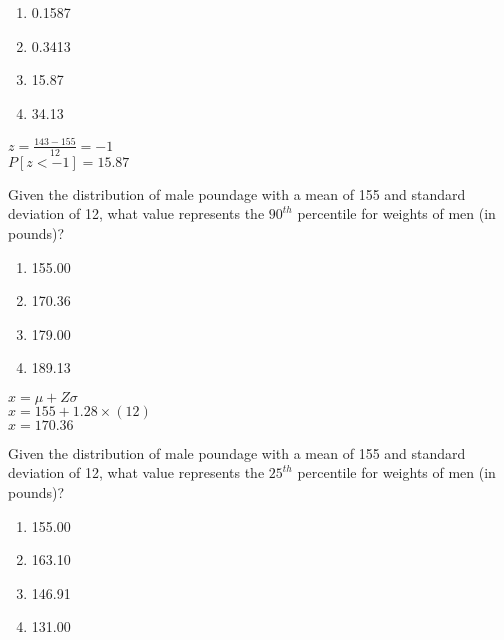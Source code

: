 \documentclass[11pt]{book}\usepackage[]{graphicx}\usepackage[]{color}
\begin{document}
\begin{exercises}
\begin{exercise}
	  \begin{enumerate}
	  \item 0.1587
	  \item 0.3413
	  \item 15.87
	  \item 34.13
	  \end{enumerate}
	  \vspace{2mm}
	\end{exercise}
	\begin{solution}   %

	    $z = \frac{143 - 155}{12} = -1$ \\
	    $P[z < -1] = 15.87$

	\end{solution}


  \begin{exercise} %

    Given the distribution of male poundage with a mean of 155 and standard deviation of 12, what value
represents the $90^{th}$ percentile for weights of men (in \\ pounds)?
	  \begin{enumerate}
	   \item 155.00
	  \item 170.36
	  \item 179.00
	  \item 189.13
	  \end{enumerate}
	  \vspace{2mm}
    
	\end{exercise}
	\begin{solution}  %

	    $x = \mu + Z \sigma$ \\
	    $x = 155 + 1.28 \times (12) $ \\
	    $x = 170.36$

  \end{solution}

  \begin{exercise} %

    Given the distribution of male poundage with a mean of 155 and standard deviation of 12, what value
represents the $25^{th}$ percentile for weights of men (in \\ pounds)?
	  \begin{enumerate}
	   \item 155.00
	  \item 163.10
	  \item 146.91
	  \item 131.00
	  \end{enumerate}
	  \vspace{2mm}
    

\end{exercise}
\end{exercises}
\end{document}
